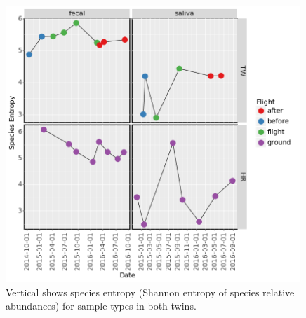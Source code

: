 \begin{figure}
  \begin{center}
    \includegraphics[width=0.99\textwidth]{figs/species_diversity.png}
	\caption{\small{
	    Vertical shows species entropy (Shannon entropy of species relative abundances) for sample types in both twins.
	}}
    \label{fig:taxadiv}
  \end{center}
\end{figure}

